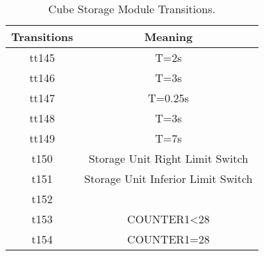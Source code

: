 \begin{table}[htbp]
\caption{Cube Storage Module Transitions.}
\centering
\begin{tabular}{cc}
Transitions & Meaning\\
\hline
tt145 & T=2s\\
tt146 & T=3s\\
tt147 & T=0.25s\\
tt148 & T=3s\\
tt149 & T=7s\\
t150 & Storage Unit Right Limit Switch\\
t151 & Storage Unit Inferior Limit Switch\\
t152 & \\
t153 & COUNTER1<28\\
t154 & COUNTER1=28\\
\end{tabular}
\end{table}
